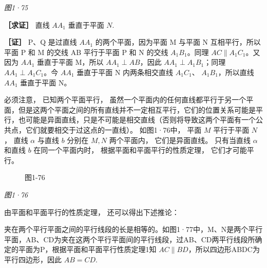\emph{图1·75}

\textbf{［求证］} 直线 \(AA_{1}\) 垂直于平面 \(N\).

\textbf{［证］} P、Q 是过直线 \(AA_{1}\) 的两个平面，因为平面 M 与平面 N
互相平行，所以平面 P 和 M 的交线 AB 平行于平面 P 和 N 的交线
\(A_{1}B_{1}\)。同理 \(AC \parallel A_{1}C_{1}\)。又因为 \(AA_{1}\)
垂直于平面 M，所以 \(AA_{1} \perp AB\)，因此
\(AA_{1} \perp A_{1}B_{1}\)；同理 \(AA_{1} \perp A_{1}C_{1}\)。今
\(AA_{1}\) 垂直于平面 N 内两条相交直线 \(A_{1}C_{1}\)、
\(A_{1}B_{1}\)，所以直线 \(AA_{1}\) 垂直于平面 N。

必须注意， 已知两个平面平行，
虽然一个平面内的任何直线都平行于另一个平面，但是这两个平面之间的所有直线并不一定相互平行，它们的位置关系可能是平行，也可能是异面直线，只是不可能是相交直线（否则将导致这两个平面有一个公共点，它们就要相交于过这点的一直线）。
如图1·76中， 平面 \(M\) 平行于平面 \(N\)， 直线 \(\alpha\) 与直线 \(b\)
分别在 \(M, N\) 两个平面内， 它们是异面直线。 只有当直线 \(\alpha\)
和直线 \(b\) 在同一个平面内时， 根据平面和平面平行的性质定理，
它们才可能平行。

\begin{figure}
\centering
{}
\caption{图1-76}
\end{figure}

\emph{图1·76}

由平面和平面平行的性质定理， 还可以得出下述推论：

夹在两个平行平面之间的平行线段的长是相等的。如图1·77中，M、N是两个平行平面，AB、CD为夹在这两个平行平面间的平行线段，过AB、CD两平行线段所确定的平面为P，根据平面和平面平行性质定理1知
\(AC \parallel BD\)，所以四边形ABDC为平行四边形，因此 \(AB = CD\).

